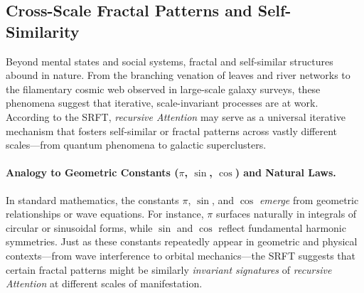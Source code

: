 \documentclass[12pt,a4paper]{article}
\begin{document}
\subsection{Cross-Scale Fractal Patterns and Self-Similarity}
\label{subsec:fractal-patterns}

Beyond mental states and social systems, fractal and self-similar structures abound in nature. From the branching venation of leaves and river networks to the filamentary cosmic web observed in large-scale galaxy surveys, these phenomena suggest that iterative, scale-invariant processes are at work. According to the SRFT, \emph{recursive Attention} may serve as a universal iterative mechanism that fosters self-similar or fractal patterns across vastly different scales---from quantum phenomena to galactic superclusters.

\paragraph{Analogy to Geometric Constants (\(\pi\), \(\sin\), \(\cos\)) and Natural Laws.} In standard mathematics, the constants \(\pi\), \(\sin\), and \(\cos\) \emph{emerge} from geometric relationships or wave equations. For instance, \(\pi\) surfaces naturally in integrals of circular or sinusoidal forms, while \(\sin\) and \(\cos\) reflect fundamental harmonic symmetries. Just as these constants repeatedly appear in geometric and physical contexts---from wave interference to orbital mechanics---the SRFT suggests that certain fractal patterns might be similarly \emph{invariant signatures} of \emph{recursive Attention} at different scales of manifestation.
\end{document}
